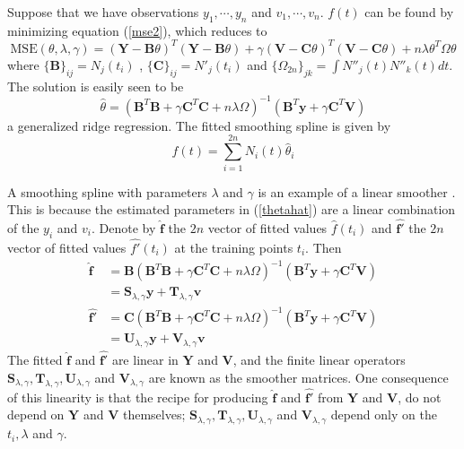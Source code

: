 Suppose that we have observations $y_1,\cdots,y_n$ and $v_1,\cdots,v_n$. $f(t)$ can be found by minimizing equation (\ref{mse2}), which reduces to
\begin{equation}
\text{MSE}(\theta, \lambda,\gamma) = (\mathbf{Y}-\mathbf{B}\theta)^T (\mathbf{Y}-\mathbf{B}\theta) +\gamma (\mathbf{V}-\mathbf{C}\theta)^T (\mathbf{V}-\mathbf{C}\theta)+n\lambda \theta^T\Omega\theta
\end{equation}
where $\{\mathbf{B}\}_{ij} = N_j(t_i)$ , $\{\mathbf{C}\}_{ij} = N'_j(t_i)$ and $\{\Omega_{2n} \}_{jk}=\int N''_j(t)N''_k(t)dt$. 
The solution is easily seen to be
\begin{equation}\label{thetahat}
\hat{\theta}=(\mathbf{B}^T\mathbf{B}+\gamma\mathbf{C}^T\mathbf{C}+n\lambda\Omega)^{-1}(\textbf{B}^T\textbf{y}+\gamma\textbf{C}^T\mathbf{V})
\end{equation}
a generalized ridge regression. The fitted smoothing spline is given by
\begin{equation}
\hat{f}(t)=\sum_{i=1}^{2n}N_i(t)\hat{\theta}_i
\end{equation}

A smoothing spline with parameters $\lambda$ and $\gamma$ is an example of a linear smoother \cite{esl2009}. This is because the estimated parameters in (\ref{thetahat}) are a linear combination of the $y_i$ and $v_i$. Denote by $\hat{\mathbf{f}}$ the $2n$ vector of fitted values $\hat{f}(t_i)$ and $\hat{\mathbf{f}'}$ the $2n$ vector of fitted values $\hat{f'}(t_i)$ at the training points $t_i$. Then
\begin{align*}
\hat{\mathbf{f}} &=\mathbf{B}(\mathbf{B}^T\mathbf{B}+\gamma\mathbf{C}^T\mathbf{C}+n\lambda\Omega)^{-1}(\textbf{B}^T\textbf{y}+\gamma\textbf{C}^T\mathbf{V})\\
&=\textbf{S}_{\lambda,\gamma}\textbf{y}+\textbf{T}_{\lambda,\gamma}\textbf{v} \\
\hat{\mathbf{f}'} &=\mathbf{C}(\mathbf{B}^T\mathbf{B}+\gamma\mathbf{C}^T\mathbf{C}+n\lambda\Omega)^{-1}(\textbf{B}^T\textbf{y}+\gamma\textbf{C}^T\mathbf{V})\\
&=\textbf{U}_{\lambda,\gamma}\textbf{y}+\textbf{V}_{\lambda,\gamma}\textbf{v}
\end{align*}
The fitted $\hat{\mathbf{f}}$ and $\hat{\mathbf{f}'}$ are linear in $\mathbf{Y}$ and $\mathbf{V}$, and the finite linear operators $\textbf{S}_{\lambda,\gamma}, \textbf{T}_{\lambda,\gamma}, \textbf{U}_{\lambda,\gamma}$ and $\textbf{V}_{\lambda,\gamma}$ are known as the smoother matrices. One consequence of this linearity is that the recipe for producing $\hat{\mathbf{f}}$ and $\hat{\mathbf{f}'}$ from $\mathbf{Y}$ and $\mathbf{V}$, do not depend on $\mathbf{Y}$ and $\mathbf{V}$ themselves; $\textbf{S}_{\lambda,\gamma}, \textbf{T}_{\lambda,\gamma}, \textbf{U}_{\lambda,\gamma}$ and $\textbf{V}_{\lambda,\gamma}$ depend only on the $t_i,\lambda$ and $\gamma$.

